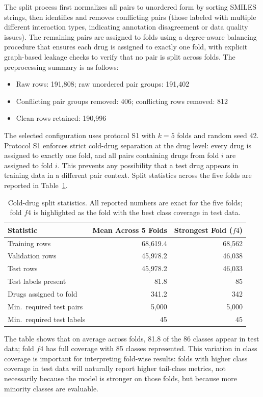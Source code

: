 \documentclass[11pt,a4paper]{report}
\begin{document}
The split process first normalizes all pairs to unordered form by sorting SMILES strings, then identifies and removes conflicting pairs (those labeled with multiple different interaction types, indicating annotation disagreement or data quality issues). The remaining pairs are assigned to folds using a degree-aware balancing procedure that ensures each drug is assigned to exactly one fold, with explicit graph-based leakage checks to verify that no pair is split across folds. The preprocessing summary is as follows:
\begin{itemize}
\item Raw rows: 191{,}808; raw unordered pair groups: 191{,}402
\item Conflicting pair groups removed: 406; conflicting rows removed: 812
\item Clean rows retained: 190{,}996
\end{itemize}
The selected configuration uses protocol S1 with \(k=5\) folds and random seed 42. Protocol S1 enforces strict cold-drug separation at the drug level: every drug is assigned to exactly one fold, and all pairs containing drugs from fold \(i\) are assigned to fold \(i\). This prevents any possibility that a test drug appears in training data in a different pair context. Split statistics across the five folds are reported in Table~\ref{tab:split_stats}.
\begin{table}[H]
\centering
\caption{Cold-drug split statistics. All reported numbers are exact for the five folds; fold \(f4\) is highlighted as the fold with the best class coverage in test data.}
\label{tab:split_stats}
\begin{tabular}{lrr}
\toprule
Statistic & Mean Across 5 Folds & Strongest Fold (\(f4\)) \\
\midrule
Training rows & 68{,}619.4 & 68{,}562 \\
Validation rows & 45{,}978.2 & 46{,}038 \\
Test rows & 45{,}978.2 & 46{,}033 \\
Test labels present & 81.8 & 85 \\
Drugs assigned to fold & 341.2 & 342 \\
Min.\ required test pairs & 5{,}000 & 5{,}000 \\
Min.\ required test labels & 45 & 45 \\
\bottomrule
\end{tabular}
\end{table}

The table shows that on average across folds, 81.8 of the 86 classes appear in test data; fold \(f4\) has full coverage with 85 classes represented. This variation in class coverage is important for interpreting fold-wise results: folds with higher class coverage in test data will naturally report higher tail-class metrics, not necessarily because the model is stronger on those folds, but because more minority classes are evaluable.
\end{document}
